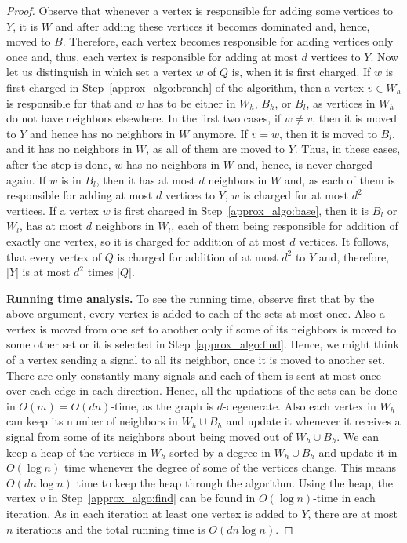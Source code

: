 \begin{proof}
Observe that whenever a vertex is responsible for adding some vertices to $Y$, it is $W$ and after adding these vertices it becomes dominated and, hence, moved to $B$. Therefore, each vertex becomes responsible for adding vertices only once and, thus, each vertex is responsible for adding at most $d$ vertices to $Y$. Now let us distinguish in which set a vertex $w$ of $Q$ is, when it is first charged. If $w$ is first charged in Step~\ref{approx_algo:branch} of the algorithm, then a vertex $v \in W_h$ is responsible for that and $w$ has to be either in $W_h$, $B_h$, or $B_l$, as vertices in $W_h$ do not have neighbors elsewhere. In the first two cases, if $w \neq v$, then it is moved to $Y$ and hence has no neighbors in $W$ anymore. If $v=w$, then it is moved to $B_l$, and it has no neighbors in $W$, as all of them are moved to $Y$. Thus, in these cases, after the step is done, $w$ has no neighbors in $W$ and, hence, is never charged again. If $w$ is in $B_l$, then it has at most $d$ neighbors in $W$ and, as each of them is responsible for adding at most $d$ vertices to $Y$, $w$ is charged for at most $d^2$ vertices. If a vertex $w$ is first charged in Step~\ref{approx_algo:base}, then it is $B_l$ or $W_l$, has at most $d$ neighbors in $W_l$, each of them being responsible for addition of exactly one vertex, so it is charged for addition of at most $d$ vertices. It follows, that every vertex of $Q$ is charged for addition of at most $d^2$ to $Y$ and, therefore, $|Y|$ is at most $d^2$ times $|Q|$.

 \noindent
{\bf Running time analysis.} 
To see the running time, observe first that by the above argument, every vertex is added to each of the sets at most once. Also a vertex is moved from one set to another only if some of its neighbors is moved to some other set or it is selected in Step~\ref{approx_algo:find}. Hence, we might think of a vertex sending a signal to all its neighbor, once it is moved to another set. There are only constantly many signals and each of them is sent at most once over each edge in each direction. Hence, all the updations of the sets can be done in $O(m)=O(dn)$-time, as the graph is $d$-degenerate. 
Also each vertex in $W_h$ can keep its number of neighbors in $W_h \cup B_h$ and update it whenever it receives a signal from some of its neighbors about being moved out of $W_h \cup B_h$. We can keep a heap of the vertices in $W_h$ sorted by a degree in  $W_h \cup B_h$ and update it in $O(\log n)$ time whenever the degree of some of the vertices change. This means $O(dn\log n)$ time to keep the heap through the algorithm. Using the heap, the vertex $v$ in Step~\ref{approx_algo:find} can be found in $O(\log n)$-time in each iteration. As in each iteration at least one vertex is added to $Y$, there are at most $n$ iterations and the total running time is $O(dn\log n)$.
\end{proof}

